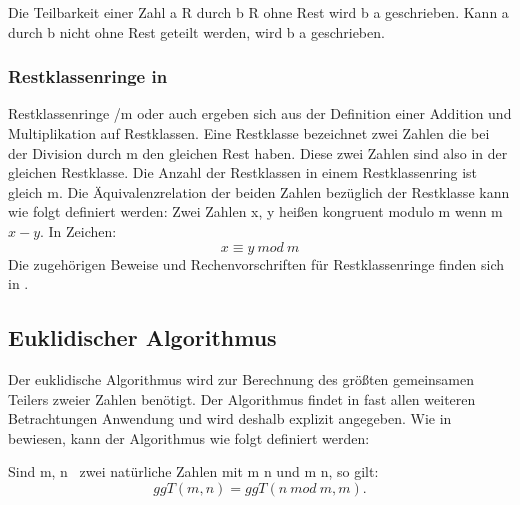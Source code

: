 			Die Teilbarkeit einer Zahl a \myin R durch b \myin R ohne Rest wird b \myTeiler a geschrieben. Kann a durch b nicht ohne Rest geteilt werden, wird b \myNichtTeiler a geschrieben.
		
		\subsubsection{Restklassenringe in }
			Restklassenringe \myMenge{Z}/m oder auch  ergeben sich aus der Definition einer Addition und Multiplikation auf Restklassen. Eine Restklasse bezeichnet zwei Zahlen \myin {} die bei der Division durch m \myin {} den gleichen Rest haben. Diese zwei Zahlen sind also in der gleichen Restklasse. Die Anzahl der Restklassen in einem Restklassenring ist gleich m. Die Äquivalenzrelation der beiden Zahlen bezüglich der Restklasse kann wie folgt definiert werden:
			Zwei Zahlen x, y \myin {} heißen kongruent modulo m \myin {} wenn m \myTeiler $x-y$. In Zeichen:
			\begin{displaymath}
				x \equiv y~mod~m
			\end{displaymath}	
			Die zugehörigen Beweise und Rechenvorschriften für Restklassenringe finden sich in \cite{Algorithmische:Zahlentheorie}.
			
		\subsection{Euklidischer Algorithmus}
			Der euklidische Algorithmus wird zur Berechnung des größten gemeinsamen Teilers zweier Zahlen benötigt. Der Algorithmus findet in fast allen weiteren Betrachtungen Anwendung und wird deshalb explizit angegeben. Wie in \cite{Diskrete:Strukturen} bewiesen, kann der Algorithmus wie folgt definiert werden:
			
			Sind m, n \myin {}\ zwei natürliche Zahlen mit m \myKleinerGleich n und m \myNichtTeiler n, so gilt:
			\begin{displaymath}
				ggT(m, n) = ggT(n~mod~m, m).
			\end{displaymath}
						
